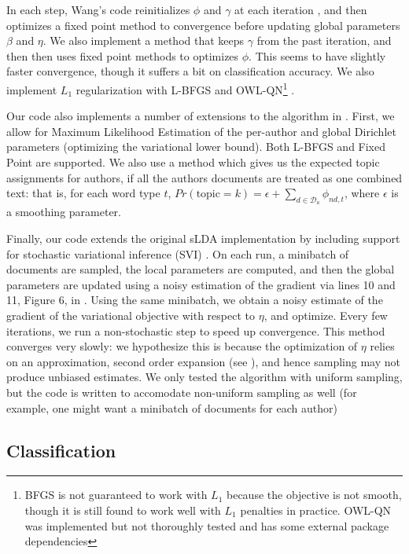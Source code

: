 \documentclass[14pt]{article} %
\theoremstyle{plain}
\theoremstyle{definition}
\theoremstyle{remark}
\begin{document}
\begin{appendix}
In each step, Wang's code reinitializes $\phi$ and $\gamma$ at each iteration \cite{wang2009simultaneous}, and then optimizes a fixed point method to convergence before updating global parameters $\beta$ and $\eta$. We also implement a method that keeps $\gamma$ from the past iteration, and then then uses fixed point methods to optimizes $\phi$. This seems to have slightly faster convergence, though it suffers a bit on classification accuracy. We also implement $L_1$ regularization with L-BFGS \cite{liu1989limited} and OWL-QN\footnote{BFGS is not guaranteed to work with $L_1$ because the objective is not smooth, though it is still found to work well with $L_1$ penalties in practice. OWL-QN was implemented but not thoroughly tested and has some external package dependencies} \cite{andrew2007scalable}.

Our code also implements a number of extensions to the algorithm in \cite{wang2009simultaneous}. First, we allow for Maximum Likelihood Estimation of the per-author and global Dirichlet parameters (optimizing the variational lower bound). Both L-BFGS and Fixed Point \cite{minka2000estimating} are supported. We also use a method which gives us the expected topic assignments for authors, if all the authors documents are treated as one combined text: that is, for each word type $t$, $Pr(\text{topic}=k) = \epsilon + \sum_{d\in \mathcal{D}_a}\phi_{nd,t}$, where $\epsilon$ is a smoothing parameter.

Finally, our code extends the original sLDA implementation by including support for stochastic variational inference (SVI) \cite{hoffman2013stochastic}. On each run, a minibatch of documents are sampled, the local parameters are computed, and then the global parameters are updated using a noisy estimation of the gradient via lines 10 and 11, Figure 6, in  \cite{hoffman2013stochastic}. Using the same minibatch, we obtain a noisy estimate of the gradient of the variational objective with respect to $\eta$, and optimize. Every few iterations, we run a non-stochastic step to speed up convergence. This method converges very slowly: we hypothesize this is because the optimization of $\eta$ relies on an approximation, second order expansion (see \cite{wang2009simultaneous}), and hence sampling may not produce unbiased estimates. We only tested the algorithm with uniform sampling, but the code is written to accomodate non-uniform sampling as well (for example, one might want a minibatch of documents for each author)


\subsection{Classification}
\label{appendix:classification}


\end{appendix}
\end{document}
